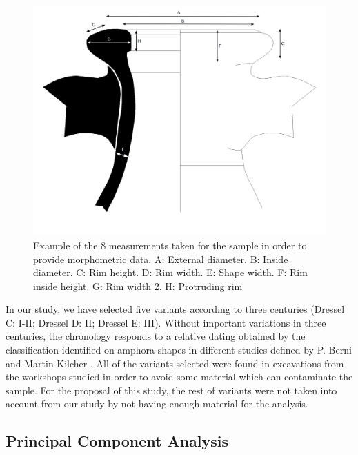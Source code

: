 \documentclass[review]{elsarticle}
\begin{document}
\begin{figure}[htp]
	\centering
\includegraphics[scale=0.10]{mesures.png}
\caption{Example of the 8 measurements taken for the sample in order to provide morphometric data. A: External diameter. B: Inside diameter. C: Rim height. D: Rim width. E: Shape width. F: Rim inside height. G: Rim width 2. H: Protruding rim}
\label{mesures}
\end{figure} 

In our study, we have selected five variants according to three centuries (Dressel C: I-II; Dressel D: II; Dressel E: III). Without important variations in three centuries, the chronology responds to a relative dating obtained by the classification identified on amphora shapes in different studies defined by P. Berni \citep{berni_millet_epigrafianforica_2008} and Martin Kilcher \citep{martin-kilcher_romischen_1994}. All of the variants selected were found in excavations from the workshops studied in order to avoid some material which can contaminate the sample. For the proposal of this study, the rest of variants were not taken into account from our study by not having enough material for the analysis. 

\subsection{Principal Component Analysis}
\end{document}
